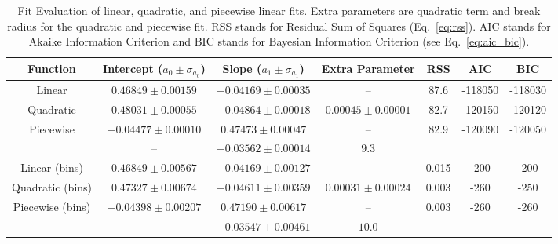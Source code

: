 
\begin{table*}
\caption{
Fit Evaluation of linear, quadratic, and piecewise linear fits.
Extra parameters are quadratic term and break radius for the quadratic and piecewise fit.
RSS stands for Residual Sum of Squares (Eq.~\ref{eq:rss}).
AIC stands for Akaike Information Criterion and BIC stands for Bayesian Information Criterion (see Eq.~\ref{eq:aic_bic}).
}
\label{tab:global_fit_results_comparison}
\begin{tabularx}{\columnwidth}{CCCCCCC}
\hline
Function & Intercept ($a_0 \pm \sigma_{a_0}$) & Slope ($a_1 \pm \sigma_{a_1}$) & Extra Parameter & RSS & AIC & BIC \\
\hline
Linear & $0.46849 \pm 0.00159$  & $-0.04169 \pm 0.00035$ & -- & 87.6 & -118050  & -118030 \\ 
Quadratic & $0.48031 \pm 0.00055$  & $-0.04864 \pm 0.00018$ & $0.00045 \pm 0.00001$ & 82.7 & -120150  & -120120 \\ 
Piecewise & $-0.04477 \pm 0.00010$ & $0.47473 \pm 0.00047$ & -- & 82.9 & -120090  & -120050 \\ 
 & -- & $-0.03562 \pm 0.00014$ & $9.3$ & & & \\ 
\hline
Linear (bins)& $0.46849 \pm 0.00567$  & $-0.04169 \pm 0.00127$ & -- & 0.015 & -200  & -200 \\ 
Quadratic (bins) & $0.47327 \pm 0.00674$  & $-0.04611 \pm 0.00359$ & $0.00031 \pm 0.00024$ & 0.003 & -260  & -250 \\ 
Piecewise (bins) & $-0.04398 \pm 0.00207$ & $0.47190 \pm 0.00617$ & -- & 0.003 & -260  & -260 \\ 
 & -- & $-0.03547 \pm 0.00461$ & $10.0$ & & & \\ 
\hline
\end{tabularx}
\end{table*}
